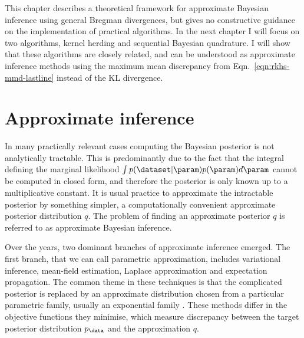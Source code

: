This chapter describes a theoretical framework for approximate Bayesian inference using general Bregman divergences, but gives no constructive guidance on the implementation of practical algorithms. In the next chapter I will focus on two algorithms, kernel herding and sequential Bayesian quadrature. I will show that these algorithms are closely related, and can be understood as approximate inference methods using the maximum mean discrepancy from Eqn.\ \eqref{eqn:rkhs-mmd-lastline} instead of the KL divergence.


\section{Approximate inference\label{sec:losscalibrated}}

In many practically relevant cases computing the Bayesian posterior is not analytically tractable. This is predominantly due to the fact that the integral defining the marginal likelihood $\int p(\dataset\vert\param)p(\param)d\param$ cannot be computed in closed form, and therefore the posterior is only known up to a multiplicative constant. It is usual practice to approximate the intractable posterior by something simpler, a computationally convenient approximate posterior distribution $q$. The problem of finding an approximate posterior $q$ is referred to as approximate Bayesian inference.

Over the years, two dominant branches of approximate inference emerged. The first branch, that we can call parametric approximation, includes variational inference, mean-field estimation, Laplace approximation and expectation propagation. The common theme in these techniques is that the complicated posterior is replaced by an approximate distribution chosen from a particular parametric family, usually an exponential family \citep{Wainwright2008}. These methods differ in the objective functions they minimise, which measure discrepancy between the target posterior distribution $p_\data$ and the approximation $q$.

